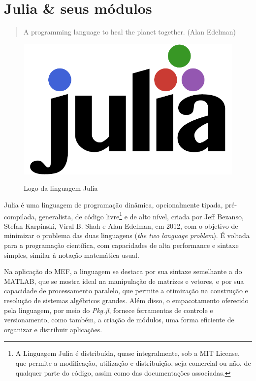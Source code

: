 \chapter{Julia \& seus módulos} 
\label{ch:julia}

\begin{quotation}
    A programming language to heal the planet together.
    (Alan Edelman)
\end{quotation}

\begin{figure}[hbtp]
    \centering
    \caption{Logo da linguagem Julia}
    \includegraphics[scale = 0.6]{Figuras/julia-logo-color.pdf}
    \label{fig:julia-logo}
\end{figure}

Julia é uma linguagem de programação dinâmica, opcionalmente tipada, pré-compilada, generalista, de código livre\footnote{A Linguagem Julia é distribuída, quase integralmente, sob a MIT License, que permite a modificação, utilização e distribuição, seja comercial ou não, de qualquer parte do código, assim como das documentações associadas.} e de alto nível, criada por Jeff Bezanso, Stefan Karpinski, Viral B. Shah e Alan Edelman, em 2012, com o objetivo de minimizar o problema das duas linguagens (\emph{the two language problem}). É voltada para a programação científica, com capacidades de alta performance e sintaxe simples, similar à notação matemática usual. \cite{Sherrington}

Na aplicação do MEF, a linguagem se destaca por sua sintaxe semelhante a do MATLAB, que se mostra ideal na manipulação de matrizes e vetores, e por sua capacidade de processamento paralelo, que permite a otimização na construção e resolução de sistemas algébricos grandes. Além disso, o empacotamento oferecido pela linguagem, por meio do \emph{Pkg.jl}, fornece ferramentas de controle e versionamento, como também, a criação de módulos, uma forma eficiente de organizar e distribuir aplicações.

